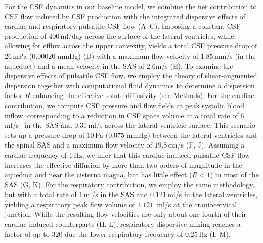 \documentclass[fleqn,10pt]{wlscirep}
\begin{document}
For the CSF dynamics in our baseline model, we combine the net
contribution to CSF flow induced by CSF production with the integrated
dispersive effects of cardiac and respiratory pulsatile CSF flow
(A--C). Imposing a constant CSF production of
$400\,$ml/day across the surface of the lateral ventricles, while
allowing for efflux across the upper convexity, yields a total CSF
pressure drop of $26\,$mPa (0.00020 mmHg) (D) with a
maximum flow velocity of $1.85\,$mm/s (in the aqueduct) and a mean
velocity in the SAS of $2.6$\textmu m/s (E). To examine the
dispersive effects of pulsatile CSF flow, we employ the theory of
shear-augmented dispersion together with computational fluid dynamics
to determine a dispersion factor $R$ enhancing the effective solute
diffusivity (see Methods). For the cardiac contribution, we compute
CSF pressure and flow fields at peak systolic blood inflow,
corresponding to a reduction in CSF space volume at a total rate of
$6\,$ml/s~\cite{baledent2014imaging, causemann2022human} in the SAS
and $0.31\,$ml/s across the lateral ventricle
surface\cite{vinje2019respiratory}. This scenario sets up a pressure
drop of $10\,$Pa ($0.075$ mmHg) between the lateral ventricles and the
spinal SAS and a maximum flow velocity of $19.8\,$cm/s
(F, J). Assuming a cardiac frequency of $1\,$Hz, we
infer that this cardiac-induced pulsatile CSF flow increases the
effective diffusion by more than two orders of magnitude in the
aqueduct and near the cisterna magna, but has little effect ($R <
1$) in most of the SAS (G, K). For the respiratory
contribution, we employ the same methodology, but with a total rate of
$1\,$ml/s \cite{gutierrez2022effect} in the SAS and $0.121\,$ml/s
\cite{liu2024using} in the lateral ventricles, yielding a respiratory
peak flow volume of $1.121\,$ ml/s at the craniocervical
junction. While the resulting flow velocities are only about one
fourth of their cardiac-induced counterparts (H, L),
respiratory dispersive mixing reaches a factor of up to 320 due the
lower respiratory frequency of $0.25\,$Hz (I, M).
\end{document}
